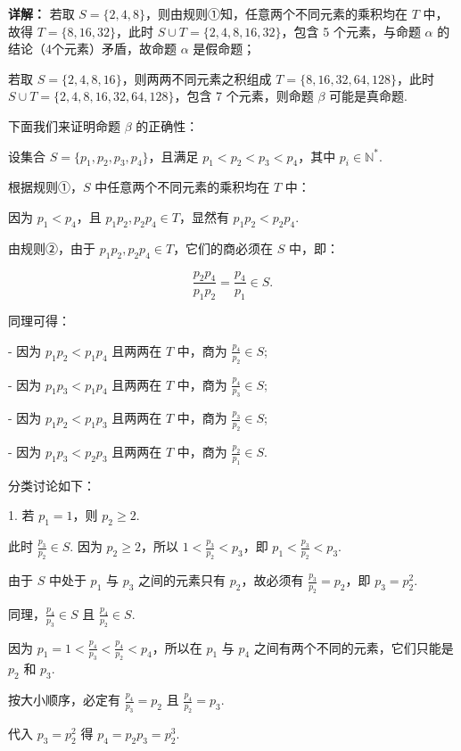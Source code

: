 \documentclass[11pt,a4paper]{ctexart}
\begin{document}
\textbf{详解：}
若取 \(S=\{2,4,8\}\)，则由规则①知，任意两个不同元素的乘积均在 $T$ 中，故得 \(T=\{8,16,32\}\)，此时 \(S\cup T=\{2,4,8,16,32\}\)，包含 5 个元素，与命题 \(\alpha\) 的结论（4个元素）矛盾，故命题 \(\alpha\) 是假命题；

若取 \(S=\{2,4,8,16\}\)，则两两不同元素之积组成 \(T=\{8,16,32,64,128\}\)，此时 \(S\cup T=\{2,4,8,16,32,64,128\}\)，包含 7 个元素，则命题 \(\beta\) 可能是真命题.

下面我们来证明命题 \(\beta\) 的正确性：

设集合 \(S=\{p_{1},p_{2},p_{3},p_{4}\}\)，且满足 \(p_{1}<p_{2}<p_{3}<p_{4}\)，其中 \(p_i \in \mathbb{N}^*\).

根据规则①，\(S\) 中任意两个不同元素的乘积均在 $T$ 中：

因为 \(p_{1}<p_{4}\)，且 \(p_{1}p_{2}, p_{2}p_{4} \in T\)，显然有 \(p_{1}p_{2} < p_{2}p_{4}\).

由规则②，由于 \(p_{1}p_{2}, p_{2}p_{4} \in T\)，它们的商必须在 $S$ 中，即：

\[
\frac{p_{2}p_{4}}{p_{1}p_{2}} = \frac{p_{4}}{p_{1}} \in S.
\]

同理可得：

- 因为 \(p_1p_2 < p_1p_4\) 且两两在 $T$ 中，商为 \(\frac{p_4}{p_2} \in S\);

- 因为 \(p_1p_3 < p_1p_4\) 且两两在 $T$ 中，商为 \(\frac{p_4}{p_3} \in S\);

- 因为 \(p_1p_2 < p_1p_3\) 且两两在 $T$ 中，商为 \(\frac{p_3}{p_2} \in S\);

- 因为 \(p_1p_3 < p_2p_3\) 且两两在 $T$ 中，商为 \(\frac{p_2}{p_1} \in S\).

分类讨论如下：

1. 若 \(p_{1}=1\)，则 \(p_{2}\geq 2\).

此时 \(\frac{p_{3}}{p_{2}} \in S\). 因为 \(p_2 \ge 2\)，所以 \(1 < \frac{p_3}{p_2} < p_3\)，即 \(p_1 < \frac{p_3}{p_2} < p_3\).

由于 \(S\) 中处于 \(p_1\) 与 \(p_3\) 之间的元素只有 \(p_2\)，故必须有 \(\frac{p_{3}}{p_{2}}=p_{2}\)，即 \(p_{3}=p_{2}^{2}\).

同理，\(\frac{p_{4}}{p_{3}} \in S\) 且 \(\frac{p_{4}}{p_{2}} \in S\).

因为 \(p_1 = 1 < \frac{p_4}{p_3} < \frac{p_4}{p_2} < p_4\)，所以在 \(p_1\) 与 \(p_4\) 之间有两个不同的元素，它们只能是 \(p_2\) 和 \(p_3\).

按大小顺序，必定有 \(\frac{p_4}{p_3} = p_2\) 且 \(\frac{p_4}{p_2} = p_3\).

代入 \(p_3 = p_2^2\) 得 \(p_4 = p_2 p_3 = p_2^3\).
\end{document}
